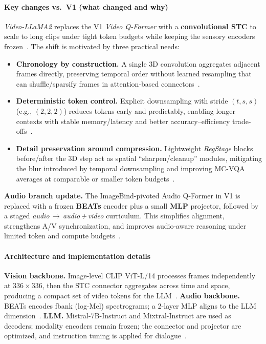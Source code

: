 \begin{enrichment}
\begin{enrichment}
        \paragraph{Key changes vs.\ V1 (what changed and why)}
        \emph{Video\mbox{-}LLaMA2} replaces the V1 \emph{Video Q\mbox{-}Former} with a \textbf{convolutional STC} to scale to long clips under tight token budgets while keeping the sensory encoders frozen~\cite[Sec.~2]{cheng2024_videollama2}. The shift is motivated by three practical needs:
        \begin{itemize}
            \item \textbf{Chronology by construction.} A single 3D convolution aggregates adjacent frames directly, preserving temporal order without learned resampling that can shuffle/sparsify frames in attention-based connectors~\cite[Sec.~2.1]{cheng2024_videollama2}.
            \item \textbf{Deterministic token control.} Explicit downsampling with stride $(t,s,s)$ (e.g., $(2,2,2)$) reduces tokens early and predictably, enabling longer contexts with stable memory/latency and better accuracy–efficiency trade-offs~\cite[Sec.~2.1; Tab.~1]{cheng2024_videollama2}.
            \item \textbf{Detail preservation around compression.} Lightweight \emph{RegStage} blocks before/after the 3D step act as spatial “sharpen/cleanup” modules, mitigating the blur introduced by temporal downsampling and improving MC\mbox{-}VQA averages at comparable or smaller token budgets~\cite[Sec.~2.1; Tab.~1]{cheng2024_videollama2}.
        \end{itemize}
        
        \textbf{Audio branch update.} The ImageBind\mbox{-}pivoted Audio Q\mbox{-}Former in V1 is replaced with a frozen \textbf{BEATs} encoder plus a small \textbf{MLP} projector, followed by a staged \emph{audio}\,$\rightarrow$\,\emph{audio\,+\,video} curriculum. This simplifies alignment, strengthens A/V synchronization, and improves audio\mbox{-}aware reasoning under limited token and compute budgets~\cite[Sec.~2.2, 3.2]{cheng2024_videollama2}.
        
        \paragraph{Architecture and implementation details}
        \textbf{Vision backbone.} Image-level CLIP ViT-L/14 processes frames independently at \(336{\times}336\), then the STC connector aggregates across time and space, producing a compact set of video tokens for the LLM~\cite[Sec.~2.1]{cheng2024_videollama2}. 
        \textbf{Audio backbone.} BEATs encodes fbank (log-Mel) spectrograms; a 2-layer MLP aligns to the LLM dimension~\cite[Sec.~2.2]{cheng2024_videollama2}. 
        \textbf{LLM.} Mistral-7B-Instruct and Mixtral-Instruct are used as decoders; modality encoders remain frozen; the connector and projector are optimized, and instruction tuning is applied for dialogue~\cite[Sec.~2]{cheng2024_videollama2}. 
        

\end{enrichment}
\end{enrichment}
